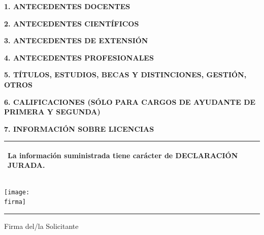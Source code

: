 \documentclass{article}
\newcommand{\titulosec}[1]{\textbf{\textsf{\MakeUppercase{#1}}}}
\newcommand{\recuadro}[1]{
  \begin{center}
  \begin{tabular}{|m{0.9\textwidth}|}
      \hline
      \begin{center}
      \textsf{\textbf{#1}}
      \end{center}
      \\
      \hline
  \end{tabular}
  \end{center}
}
\begin{document}
\noindent \titulosec{1. Antecedentes docentes}



\noindent \titulosec{2. Antecedentes científicos}



\noindent \titulosec{3. Antecedentes de extensión}



\noindent \titulosec{4. Antecedentes profesionales}



\noindent \titulosec{5. Títulos, estudios, becas y distinciones, gestión, otros}



\noindent \titulosec{6. Calificaciones (sólo para cargos de Ayudante de Primera y Segunda)}



\noindent \titulosec{7. Información sobre licencias}

\licencias

\recuadro{La información suministrada tiene carácter de DECLARACIÓN JURADA.}

\vspace{100pt}

\begin{center}
\ifdefined\firma \texttt{[image: \\firma]}\fi

\noindent\rule{5cm}{1pt}

Firma del/la Solicitante
\end{center}
\end{document}
